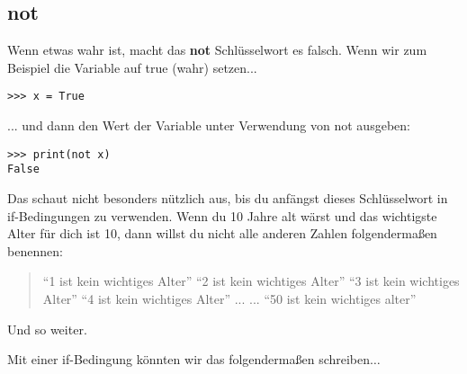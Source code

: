 \subsection*{not}

Wenn etwas wahr ist, macht das \textbf{not} Schlüsselwort es falsch. Wenn wir zum Beispiel die Variable  auf true (wahr) setzen...

\begin{Verbatim}[frame=single]
>>> x = True
\end{Verbatim}

... und dann den Wert der Variable unter Verwendung von not ausgeben:

\begin{Verbatim}[frame=single]
>>> print(not x)
False
\end{Verbatim}

Das schaut nicht besonders nützlich aus, bis du anfängst dieses Schlüsselwort in if-Bedingungen zu verwenden. Wenn du 10 Jahre alt wärst und das wichtigste Alter für dich ist 10, dann willst du nicht alle anderen Zahlen folgendermaßen benennen:

\begin{quotation}
``1 ist kein wichtiges Alter''
``2 ist kein wichtiges Alter''
``3 ist kein wichtiges Alter''
``4 ist kein wichtiges Alter''
...
...
``50 ist kein wichtiges alter''
\end{quotation}

Und so weiter.
\par\noindent
Mit einer if-Bedingung könnten wir das folgendermaßen schreiben$\ldots$

